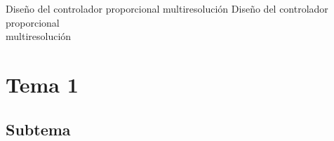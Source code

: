 \initchapterlong
    {Diseño del controlador proporcional multiresolución}
    {Diseño del controlador proporcional \\multiresolución}\label{chap:pmr ctrl}


\lipsum[17]

\section{Tema 1}\label{sec:Tema1}

    \lipsum[17]

    \subsection{Subtema}